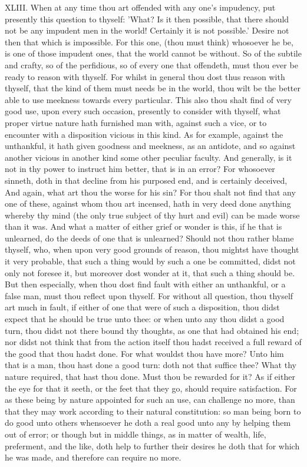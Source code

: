 XLIII. When at any time thou art offended with any one's impudency, put
presently this question to thyself: 'What? Is it then possible, that there
should not be any impudent men in the world! Certainly it is not
possible.' Desire not then that which is impossible. For this one, (thou
must think) whosoever he be, is one of those impudent ones, that the world
cannot be without. So of the subtile and crafty, so of the perfidious, so
of every one that offendeth, must thou ever be ready to reason with
thyself. For whilst in general thou dost thus reason with thyself, that
the kind of them must needs be in the world, thou wilt be the better able
to use meekness towards every particular. This also thou shalt find of
very good use, upon every such occasion, presently to consider with
thyself, what proper virtue nature hath furnished man with, against such a
vice, or to encounter with a disposition vicious in this kind. As for
example, against the unthankful, it hath given goodness and meekness, as
an antidote, and so against another vicious in another kind some other
peculiar faculty. And generally, is it not in thy power to instruct him
better, that is in an error? For whosoever sinneth, doth in that decline
from his purposed end, and is certainly deceived, And again, what art thou
the worse for his sin? For thou shalt not find that any one of these,
against whom thou art incensed, hath in very deed done anything whereby
thy mind (the only true subject of thy hurt and evil) can be made worse
than it was. And what a matter of either grief or wonder is this, if he
that is unlearned, do the deeds of one that is unlearned? Should not thou
rather blame thyself, who, when upon very good grounds of reason, thou
mightst have thought it very probable, that such a thing would by such a
one be committed, didst not only not foresee it, but moreover dost wonder
at it, that such a thing should be. But then especially, when thou dost
find fault with either an unthankful, or a false man, must thou reflect
upon thyself. For without all question, thou thyself art much in fault, if
either of one that were of such a disposition, thou didst expect that he
should be true unto thee: or when unto any thou didst a good turn, thou
didst not there bound thy thoughts, as one that had obtained his end; nor
didst not think that from the action itself thou hadst received a full
reward of the good that thou hadst done. For what wouldst thou have more?
Unto him that is a man, thou hast done a good turn: doth not that suffice
thee? What thy nature required, that hast thou done. Must thou be rewarded
for it? As if either the eye for that it seeth, or the feet that they go,
should require satisfaction. For as these being by nature appointed for
such an use, can challenge no more, than that they may work according to
their natural constitution: so man being born to do good unto others
whensoever he doth a real good unto any by helping them out of error; or
though but in middle things, as in matter of wealth, life, preferment, and
the like, doth help to further their desires he doth that for which he was
made, and therefore can require no more.

